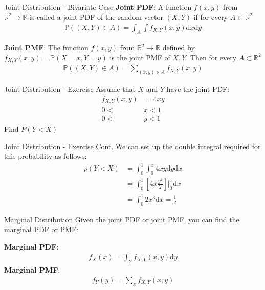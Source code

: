 \documentclass{beamer}
\begin{document}
\begin{frame}{Joint Distribution - Bivariate Case}
\textbf{Joint PDF}:
A function $f(x, y)$ from $\mathbb{R}^{2} \rightarrow \mathbb{R}$ is called a joint PDF of the random vector $(X, Y)$ if for every $A \subset \mathbb{R}^{2}$
\begin{align*}
\mathbb{P}((X, Y) \in A) = \int_{A}\int f_{X, Y}(x, y) \mathrm{d}x\mathrm{d}y
\end{align*} 

\textbf{Joint PMF}:
The function $f(x, y)$ from $\mathbb{R}^{2} \rightarrow \mathbb{R}$ defined by $f_{X, Y}(x, y) = \mathbb{P}(X = x, Y = y)$ is the joint PMF of $X, Y$. Then for every $A \subset \mathbb{R}^{2}$
\begin{align*}
\mathbb{P}((X, Y)\in A) = \sum_{(x, y)\in A}f_{X, Y}(x, y)
\end{align*}
\end{frame}

\begin{frame}{Joint Distribution - Exercise}
Assume that $X$ and $Y$ have the joint PDF:
\begin{align*}
    f_{X,Y}(x, y) &= 4xy \\
    0<&x<1\\
    0<&y<1
\end{align*}
Find $P(Y < X)$
\end{frame}
 
\begin{frame}{Joint Distribution - Exercise Cont.}
We can set up the double integral required for this probability as follows:
\begin{align*}
p(Y<X) &= \int_{0}^{1}\int_{0}^{x}4 xy \mathrm{d}y\mathrm{d}{x} \\
&= \int_{0}^{1}[4x \frac{y^{2}}{2}]\bigg|_{0}^{x}\mathrm{d}{x}\\
&= \int_{0}^{1}2x^{3}\mathrm{d}{x} = \frac{1}{2}
\end{align*}
\end{frame}
 
\begin{frame}{Marginal Distribution}
Given the joint PDF or joint PMF, you can find the marginal PDF or PMF:

\textbf{Marginal PDF}:
\begin{align*}
f_{X}(x) = \int_{Y} f_{X, Y}(x, y) \mathrm{d}y
\end{align*}
\textbf{Marginal PMF}:
\begin{align*}
f_{Y}(y) = \sum_{x} f_{X, Y}(x, y) 
\end{align*}
\end{frame}
\end{document}
